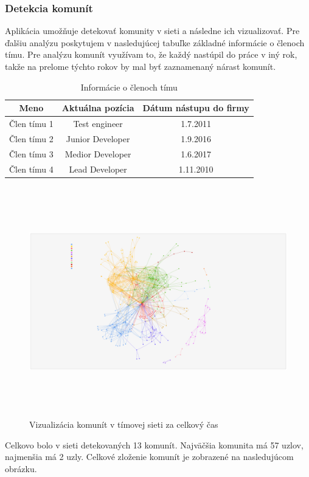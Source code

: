 \documentclass[slovak,master,public,dept460,male,cpdeclaration,oneside]{diploma}
\begin{document}
\subsubsection{Detekcia komunít}
Aplikácia umožňuje detekovať komunity v sieti a následne ich vizualizovať. Pre ďalšiu analýzu poskytujem v nasledujúcej tabuľke základné informácie o členoch tímu. Pre analýzu komunít využívam to, že každý nastúpil do práce v iný rok, takže na prelome týchto rokov by mal byť zaznamenaný nárast komunít.

\begin{table}[h!]
\centering
\begin{tabular}{ c c c }
 Meno & Aktuálna pozícia &  Dátum nástupu do firmy \\ 
 \hline
 Člen tímu 1 & Test engineer  & 1.7.2011 \\  
 Člen tímu 2  & Junior Developer  & 1.9.2016  \\
 Člen tímu 3  & Medior Developer  & 1.6.2017 \\
 Člen tímu 4  & Lead Developer & 1.11.2010 \\
\end{tabular}
\caption{Informácie o členoch tímu}
\end{table} 

\begin{figure}[H]
\centering
\includegraphics[width=17cm, height=10cm]{figures/team_communities_celkovo}
\caption{Vizualizácia komunít v tímovej sieti za celkový čas}
\end{figure}

Celkovo bolo v sieti detekovaných 13 komunít. Najväčšia komunita má 57 uzlov, najmenšia má 2 uzly. Celkové zloženie komunít je zobrazené na nasledujúcom obrázku.
\end{document}
